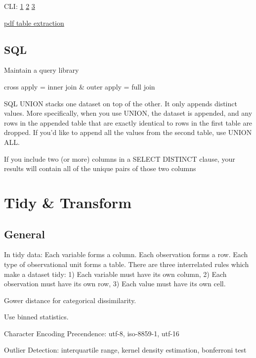 \documentclass[]{book}
\begin{document}
CLI: \href{http://bconnelly.net/working-with-csvs-on-the-command-line/\#taking-a-peek-at-the-data-set}{1} \textbar{} \href{https://opensource.com/article/17/2/command-line-tools-data-analysis-linux?sc_cid=701600000011jJVAAY}{2} \textbar{} \href{http://alexisperrier.com/shell/2017/11/07/command-line-data-scientist.html}{3}

\href{https://tabula.technology}{pdf table extraction}

\hypertarget{sql}{%
\subsection{SQL}\label{sql}}

Maintain a query library

cross apply = inner join \& outer apply = full join

SQL UNION stacks one dataset on top of the other. It only appends distinct values. More specifically, when you use UNION, the dataset is appended, and any rows in the appended table that are exactly identical to rows in the first table are dropped. If you'd like to append all the values from the second table, use UNION ALL.

If you include two (or more) columns in a SELECT DISTINCT clause, your results will contain all of the unique pairs of those two columns

\hypertarget{tidy-transform}{%
\section{Tidy \& Transform}\label{tidy-transform}}

\hypertarget{general-1}{%
\subsection{General}\label{general-1}}

In tidy data: Each variable forms a column. Each observation forms a row. Each type of observational unit forms a table. There are three interrelated rules which make a dataset tidy: 1) Each variable must have its own column, 2) Each observation must have its own row, 3) Each value must have its own cell.

Gower distance for categorical dissimilarity.

Use binned statistics.

Character Encoding Precendence: utf-8, iso-8859-1, utf-16

Outlier Detection: interquartile range, kernel density estimation, bonferroni test
\end{document}
